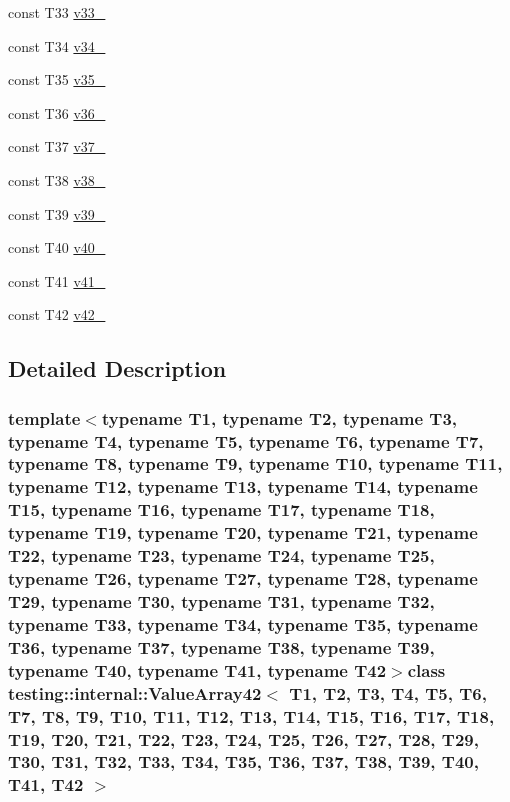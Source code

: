 \begin{DoxyCompactItemize}
\item 
const \-T33 \hyperlink{classtesting_1_1internal_1_1ValueArray42_a7a6cefe370b709c3a7b35b6d5ca8c778}{v33\-\_\-}
\item 
const \-T34 \hyperlink{classtesting_1_1internal_1_1ValueArray42_ab379e4d515d66bc57e05267515fab1d9}{v34\-\_\-}
\item 
const \-T35 \hyperlink{classtesting_1_1internal_1_1ValueArray42_a0a36112ac9b7a13572874977627ed192}{v35\-\_\-}
\item 
const \-T36 \hyperlink{classtesting_1_1internal_1_1ValueArray42_a531a52e3e8de6e982edd23c2547e4c49}{v36\-\_\-}
\item 
const \-T37 \hyperlink{classtesting_1_1internal_1_1ValueArray42_a2c4a91368c3edf933948acb4996a833d}{v37\-\_\-}
\item 
const \-T38 \hyperlink{classtesting_1_1internal_1_1ValueArray42_a364bf323d933a4adac3a9b46952ae1d3}{v38\-\_\-}
\item 
const \-T39 \hyperlink{classtesting_1_1internal_1_1ValueArray42_a0bd84ae118aa56fd251e494d1abc19fb}{v39\-\_\-}
\item 
const \-T40 \hyperlink{classtesting_1_1internal_1_1ValueArray42_ac99de9e6d59182db6141430e54f51e9c}{v40\-\_\-}
\item 
const \-T41 \hyperlink{classtesting_1_1internal_1_1ValueArray42_ad6f7550d60e8d13ade4c5033d07312e9}{v41\-\_\-}
\item 
const \-T42 \hyperlink{classtesting_1_1internal_1_1ValueArray42_a537a167baefbb86e0b3991dfd3d9437a}{v42\-\_\-}
\end{DoxyCompactItemize}


\subsection{\-Detailed \-Description}
\subsubsection*{template$<$typename T1, typename T2, typename T3, typename T4, typename T5, typename T6, typename T7, typename T8, typename T9, typename T10, typename T11, typename T12, typename T13, typename T14, typename T15, typename T16, typename T17, typename T18, typename T19, typename T20, typename T21, typename T22, typename T23, typename T24, typename T25, typename T26, typename T27, typename T28, typename T29, typename T30, typename T31, typename T32, typename T33, typename T34, typename T35, typename T36, typename T37, typename T38, typename T39, typename T40, typename T41, typename T42$>$class testing\-::internal\-::\-Value\-Array42$<$ T1, T2, T3, T4, T5, T6, T7, T8, T9, T10, T11, T12, T13, T14, T15, T16, T17, T18, T19, T20, T21, T22, T23, T24, T25, T26, T27, T28, T29, T30, T31, T32, T33, T34, T35, T36, T37, T38, T39, T40, T41, T42 $>$}



